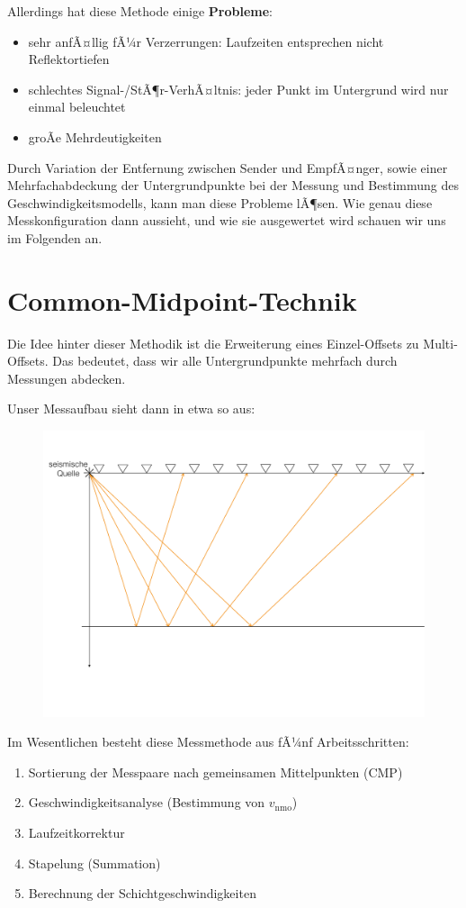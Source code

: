 Allerdings hat diese Methode einige \textbf{Probleme}: \begin{itemize}
	\item sehr anfÃ¤llig fÃ¼r Verzerrungen: Laufzeiten entsprechen nicht Reflektortiefen
	\item schlechtes Signal-/StÃ¶r-VerhÃ¤ltnis: jeder Punkt im Untergrund wird nur einmal beleuchtet
	\item groÃe Mehrdeutigkeiten
\end{itemize}

Durch Variation der Entfernung zwischen Sender und EmpfÃ¤nger, sowie einer Mehrfachabdeckung der Untergrundpunkte bei der Messung und Bestimmung des Geschwindigkeitsmodells, kann man diese Probleme lÃ¶sen. Wie genau diese Messkonfiguration dann aussieht, und wie sie ausgewertet wird schauen wir uns im Folgenden an.

\section{Common-Midpoint-Technik}
Die Idee hinter dieser Methodik ist die Erweiterung eines Einzel-Offsets zu Multi-Offsets. Das bedeutet, dass wir alle Untergrundpunkte mehrfach durch Messungen abdecken. 

Unser Messaufbau sieht dann in etwa so aus: 

\begin{figure}[H]
	\centering
	\includegraphics[width = \textwidth]{ReflexionsseismikBilder/MultiOffsetAnordnung}
\end{figure}


Im Wesentlichen besteht diese Messmethode aus fÃ¼nf Arbeitsschritten: \begin{enumerate}[label={(\arabic*)}]
	\item Sortierung der Messpaare nach gemeinsamen Mittelpunkten (CMP)
	\item Geschwindigkeitsanalyse (Bestimmung von $v_{\text{nmo}}$)
	\item Laufzeitkorrektur
	\item Stapelung (Summation)
	\item Berechnung der Schichtgeschwindigkeiten
\end{enumerate}

